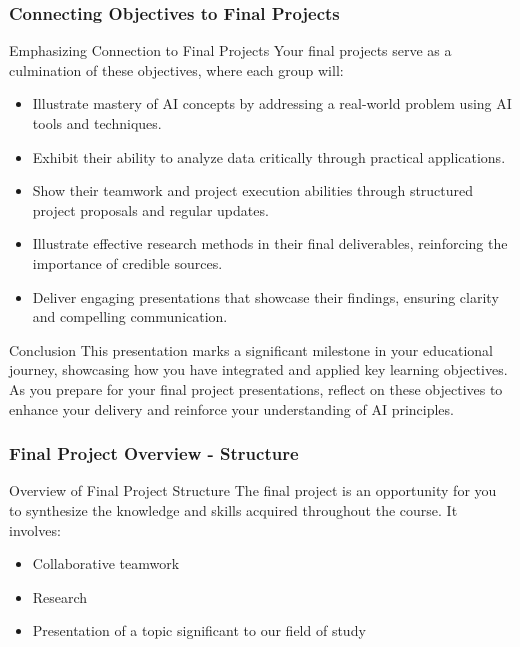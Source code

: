 \documentclass{beamer}
\begin{document}
\begin{frame}[fragile]
    \frametitle{Connecting Objectives to Final Projects}
    \begin{block}{Emphasizing Connection to Final Projects}
        Your final projects serve as a culmination of these objectives, where each group will:
        \begin{itemize}
            \item Illustrate mastery of AI concepts by addressing a real-world problem using AI tools and techniques.
            \item Exhibit their ability to analyze data critically through practical applications.
            \item Show their teamwork and project execution abilities through structured project proposals and regular updates.
            \item Illustrate effective research methods in their final deliverables, reinforcing the importance of credible sources.
            \item Deliver engaging presentations that showcase their findings, ensuring clarity and compelling communication.
        \end{itemize}
    \end{block}
    
    \begin{block}{Conclusion}
        This presentation marks a significant milestone in your educational journey, showcasing how you have integrated and applied key learning objectives. As you prepare for your final project presentations, reflect on these objectives to enhance your delivery and reinforce your understanding of AI principles.
    \end{block}
\end{frame}

\begin{frame}[fragile]
    \frametitle{Final Project Overview - Structure}
    \begin{block}{Overview of Final Project Structure}
        The final project is an opportunity for you to synthesize the knowledge and skills acquired throughout the course. It involves:
        \begin{itemize}
            \item Collaborative teamwork
            \item Research
            \item Presentation of a topic significant to our field of study
        \end{itemize}
    \end{block}
\end{frame}
\end{document}
